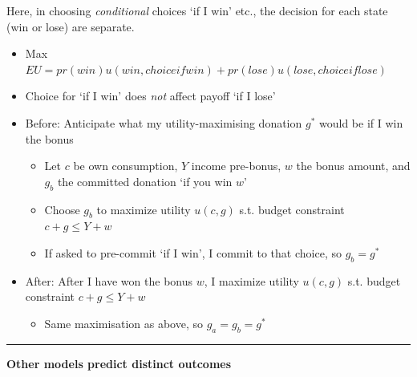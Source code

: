 \documentclass[]{article}
\providecommand{\tightlist}{%
  \setlength{\itemsep}{0pt}\setlength{\parskip}{0pt}}
\begin{document}
Here, in choosing \emph{conditional} choices `if I win' etc., the decision for each state (win or lose) are separate.

\begin{itemize}
\tightlist
\item
  Max \(EU = pr(win)u(win,choice if win) + pr(lose)u(lose,choice if lose)\)
\item
  Choice for `if I win' does \emph{not} affect payoff `if I lose'
\end{itemize}

\begin{itemize}
\tightlist
\item
  Before: Anticipate what my utility-maximising donation \(g^*\) would be if I win the bonus

  \begin{itemize}
  \tightlist
  \item
    Let \(c\) be own consumption, \(Y\) income pre-bonus, \(w\) the bonus amount, and \(g_b\) the committed donation `if you win \(w\)'
  \item
    Choose \(g_b\) to maximize utility \(u(c, g)\) s.t. budget constraint \(c+g \leq Y+w\)
  \item
    If asked to pre-commit `if I win', I commit to that choice, so \(g_b=g^*\)
  \end{itemize}
\end{itemize}

\begin{itemize}
\tightlist
\item
  After: After I have won the bonus \(w\), I maximize utility \(u(c, g)\) s.t. budget constraint \(c+g \leq Y+w\)

  \begin{itemize}
  \tightlist
  \item
    Same maximisation as above, so \(g_a=g_b=g^*\)
  \end{itemize}
\end{itemize}

\begin{center}\rule{0.5\linewidth}{\linethickness}\end{center}

\textbf{Other models predict distinct outcomes}
\end{document}
